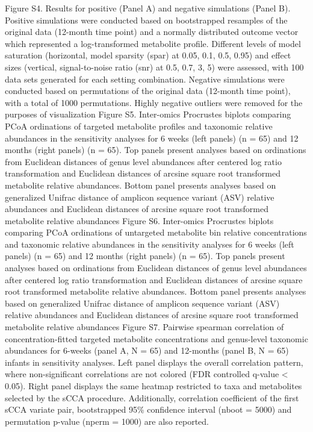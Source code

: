 Figure S4. Results for positive (Panel A) and negative simulations (Panel B). Positive simulations were conducted based on bootstrapped resamples of the original data (12-month time point) and a normally distributed outcome vector which represented a log-transformed metabolite profile. Different levels of model saturation (horizontal, model sparsity (spar) at 0.05, 0.1, 0.5, 0.95) and effect sizes (vertical, signal-to-noise ratio (snr) at 0.5, 0.7, 3, 5) were assessed, with 100 data sets generated for each setting combination. Negative simulations were conducted based on permutations of the original data (12-month time point), with a total of 1000 permutations. Highly negative outliers were removed for the purposes of visualization
Figure S5. Inter-omics Procrustes biplots comparing PCoA ordinations of targeted metabolite profiles and taxonomic relative abundances in the sensitivity analyses for 6 weeks (left panels) (n = 65) and 12 months (right panels) (n = 65). Top panels present analyses based on ordinations from Euclidean distances of genus level abundances after centered log ratio transformation and Euclidean distances of arcsine square root transformed metabolite relative abundances. Bottom panel presents analyses based on generalized Unifrac distance of amplicon sequence variant (ASV) relative abundances and Euclidean distances of arcsine square root transformed metabolite relative abundances
Figure S6. Inter-omics Procrustes biplots comparing PCoA ordinations of untargeted metabolite bin relative concentrations and taxonomic relative abundances in the sensitivity analyses for 6 weeks (left panels) (n = 65) and 12 months (right panels) (n = 65). Top panels present analyses based on ordinations from Euclidean distances of genus level abundances after centered log ratio transformation and Euclidean distances of arcsine square root transformed metabolite relative abundances. Bottom panel presents analyses based on generalized Unifrac distance of amplicon sequence variant (ASV) relative abundances and Euclidean distances of arcsine square root transformed metabolite relative abundances
Figure S7. Pairwise spearman correlation of concentration-fitted targeted metabolite concentrations and genus-level taxonomic abundances for 6-weeks (panel A, N = 65) and 12-months (panel B, N = 65) infants in sensitivity analyses. Left panel displays the overall correlation pattern, where non-significant correlations are not colored (FDR controlled q-value < 0.05). Right panel displays the same heatmap restricted to taxa and metabolites selected by the sCCA procedure. Additionally, correlation coefficient of the first sCCA variate pair, bootstrapped 95\% confidence interval (nboot = 5000) and permutation p-value (nperm = 1000) are also reported.
